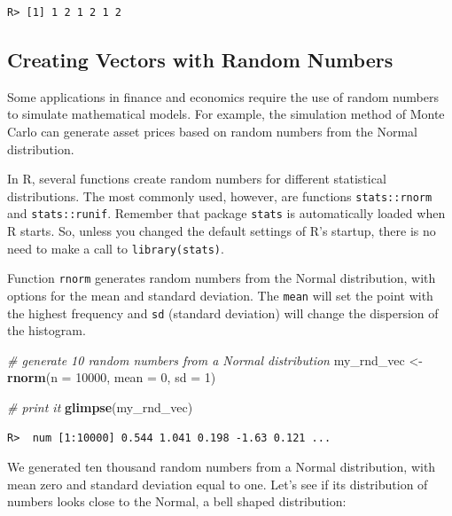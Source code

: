 \documentclass[
  12pt,
]{book}
\newenvironment{Shaded}{\begin{snugshade}}{\end{snugshade}}
\newcommand{\CommentTok}[1]{\textcolor[rgb]{0.37,0.37,0.37}{\textit{#1}}}
\newcommand{\DataTypeTok}[1]{\textcolor[rgb]{0.27,0.27,0.27}{#1}}
\newcommand{\DecValTok}[1]{\textcolor[rgb]{0.06,0.06,0.06}{#1}}
\newcommand{\KeywordTok}[1]{\textcolor[rgb]{0.27,0.27,0.27}{\textbf{#1}}}
\newcommand{\NormalTok}[1]{#1}
\newcommand{\StringTok}[1]{\textcolor[rgb]{0.5,0.5,0.5}{#1}}
\begin{document}
\begin{verbatim}
R> [1] 1 2 1 2 1 2
\end{verbatim}

\hypertarget{creating-vectors-with-random-numbers}{%
\subsection{Creating Vectors with Random Numbers}\label{creating-vectors-with-random-numbers}}

Some applications in finance and economics require the use of random numbers to simulate mathematical models. For example, the simulation method of Monte Carlo can generate asset prices based on random numbers from the Normal distribution.

In R, several functions create random numbers for different statistical distributions. The most commonly used, however, are functions \texttt{stats::rnorm} and \texttt{stats::runif}. Remember that package \texttt{stats} is automatically loaded when R starts. So, unless you changed the default settings of R's startup, there is no need to make a call to \texttt{library(stats)}.  

Function \texttt{rnorm} generates random numbers from the Normal distribution, with options for the mean and standard deviation. The \texttt{mean} will set the point with the highest frequency and \texttt{sd} (standard deviation) will change the dispersion of the histogram.

\begin{Shaded}
\begin{Highlighting}[]
\CommentTok{# generate 10 random numbers from a Normal distribution}
\NormalTok{my_rnd_vec <-}\StringTok{ }\KeywordTok{rnorm}\NormalTok{(}\DataTypeTok{n =} \DecValTok{10000}\NormalTok{, }
                    \DataTypeTok{mean =} \DecValTok{0}\NormalTok{, }
                    \DataTypeTok{sd =} \DecValTok{1}\NormalTok{)}

\CommentTok{# print it}
\KeywordTok{glimpse}\NormalTok{(my_rnd_vec)}
\end{Highlighting}
\end{Shaded}

\begin{verbatim}
R>  num [1:10000] 0.544 1.041 0.198 -1.63 0.121 ...
\end{verbatim}

We generated ten thousand random numbers from a Normal distribution, with mean zero and standard deviation equal to one. Let's see if its distribution of numbers looks close to the Normal, a bell shaped distribution:
\end{document}
